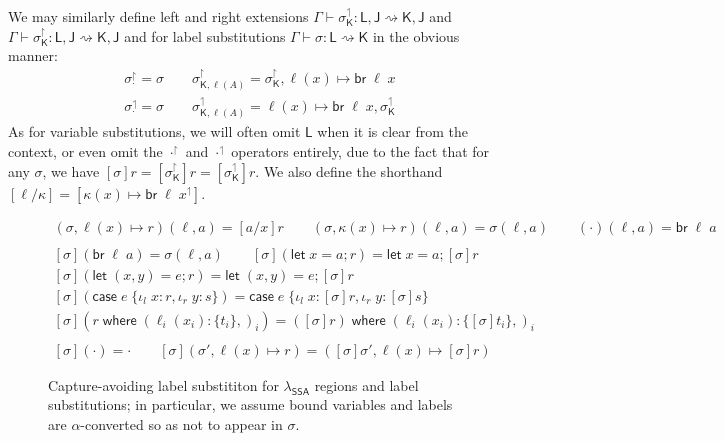 \documentclass[acmsmall,screen,review]{acmart}
\newcommand{\ms}[1]{\ensuremath{\mathsf{#1}}}
\newcommand{\lto}{:}
\newcommand{\linl}[1]{\iota_l\;{#1}}
\newcommand{\linr}[1]{\iota_r\;{#1}}
\newcommand{\letstmt}[3]{\ensuremath{\ms{let}\;#1 = #2; #3}}
\newcommand{\brb}[2]{\ms{br}\;#1\;#2}
\newcommand{\casestmt}[5]{\ms{case}\;#1\;\{\linl{#2} \lto #3, \linr{#4} \lto #5\}}
\newcommand{\where}[2]{#1\;\ms{where}\;#2}
\newcommand{\wbranch}[3]{#1(#2) \lto \{#3\}}
\newcommand{\rupg}[1]{{#1}^\upharpoonright}
\newcommand{\lupg}[1]{{#1}^\upharpoonleft}
\newcommand{\lbsubst}[4]{#1 \vdash #2: #3 \rightsquigarrow #4}
\newcommand{\isotopessa}{\(\lambda_{\ms{SSA}}\)}
\begin{document}
We may similarly define left and right extensions $\lbsubst{\Gamma}{\lupg{\sigma}_{\ms{K}}}{\ms{L},
\ms{J}}{\ms{K}, \ms{J}}$ and $\lbsubst{\Gamma}{\rupg{\sigma}_{\ms{K}}}{\ms{L}, \ms{J}}{\ms{K},
\ms{J}}$ and for label substitutions $\lbsubst{\Gamma}{\sigma}{\ms{L}}{\ms{K}}$ in the obvious
manner:
\begin{gather}
  \rupg{\sigma}_{\cdot} = \sigma \qquad 
  \rupg{\sigma}_{\ms{K}, \ell(A)} = \rupg{\sigma}_{\ms{K}}, \ell(x) \mapsto \brb{\ell}{x} \\
  \lupg{\sigma}_{\cdot} = \sigma \qquad
  \lupg{\sigma}_{\ms{K}, \ell(A)} = \ell(x) \mapsto \brb{\ell}{x}, \lupg{\sigma}_{\ms{K}}
\end{gather}
As for variable substitutions, we will often omit $\ms{L}$ when it is clear from the context, or
even omit the $\rupg{\cdot}$ and $\lupg{\cdot}$ operators entirely, due to the fact that for any
$\sigma$, we have $[\sigma]r = [\rupg{\sigma}_{\ms{K}}]r = [\lupg{\sigma}_{\ms{K}}]r$. We also
define the shorthand $[\ell / \kappa] = [\lupg{\kappa(x) \mapsto \brb{\ell}{x}}]$.

\begin{figure}
  \begin{gather*}
    (\sigma, \ell(x) \mapsto r)(\ell, a) = [a/x]r \qquad
    (\sigma, \kappa(x) \mapsto r)(\ell, a) = \sigma(\ell, a) \qquad
    (\cdot)(\ell, a) = \brb{\ell}{a}
    \\ \\
    [\sigma](\brb{\ell}{a}) = \sigma(\ell, a) \qquad
    [\sigma](\letstmt{x}{a}{r}) = \letstmt{x}{a}{[\sigma]r} \\
    [\sigma](\letstmt{(x, y)}{e}{r}) = \letstmt{(x, y)}{e}{[\sigma]r} \\
    [\sigma](\casestmt{e}{x}{r}{y}{s}) = \casestmt{e}{x}{[\sigma]r}{y}{[\sigma]s} \\
    [\sigma](\where{r}{(\wbranch{\ell_i}{x_i}{t_i},)_i}) =
    \where{([\sigma]r)}{(\wbranch{\ell_i}{x_i}{[\sigma]t_i},)_i} 
    \\ \\
    [\sigma](\cdot) = \cdot \qquad
    [\sigma](\sigma', \ell(x) \mapsto r) 
    = ([\sigma]\sigma', \ell(x) \mapsto [\sigma]r)
  \end{gather*}
  \caption{ 
    Capture-avoiding label substititon for \isotopessa{} regions and label substitutions; in 
    particular, we assume bound variables and labels are $\alpha$-converted  so as not to appear in 
    $\sigma$. 
  } 
  \Description{}
  \label{fig:ssa-label-subst-def}
\end{figure}
\end{document}
